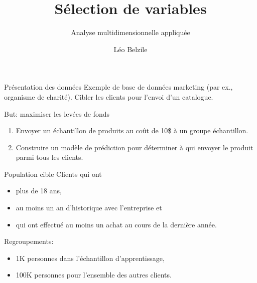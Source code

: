 \documentclass[
  ignorenonframetext,
]{beamer}
\title{Sélection de variables}
\subtitle{Analyse multidimensionnelle appliquée}
\author{Léo Belzile}
\date{}
\institute{HEC Montréal}
\providecommand{\tightlist}{%
  \setlength{\itemsep}{0pt}\setlength{\parskip}{0pt}}\usepackage{longtable,booktabs,array}
\begin{document}
\frame{\titlepage}
\ifdefined\Shaded\renewenvironment{Shaded}{\begin{tcolorbox}[interior hidden, borderline west={3pt}{0pt}{shadecolor}, enhanced, boxrule=0pt, frame hidden, sharp corners, breakable]}{\end{tcolorbox}}\fi

\begin{frame}{Présentation des données}
\protect\hypertarget{pruxe9sentation-des-donnuxe9es}{}
Exemple de base de données marketing (par ex., organisme de charité).
Cibler les clients pour l'envoi d'un catalogue.

But: maximiser les levées de fonds

\begin{enumerate}
\tightlist
\item
  Envoyer un échantillon de produits au coût de 10\$ à un groupe
  échantillon.
\item
  Construire un modèle de prédiction pour déterminer à qui envoyer le
  produit parmi tous les clients.
\end{enumerate}
\end{frame}

\begin{frame}{Population cible}
\protect\hypertarget{population-cible}{}
Clients qui ont

\begin{itemize}
\tightlist
\item
  plus de 18 ans,
\item
  au moins un an d'historique avec l'entreprise et
\item
  qui ont effectué au moins un achat au cours de la dernière année.
\end{itemize}

Regroupements:

\begin{itemize}
\tightlist
\item
  1K personnes dans l'échantillon d'apprentissage,
\item
  100K personnes pour l'ensemble des autres clients.
\end{itemize}
\end{frame}
\end{document}
